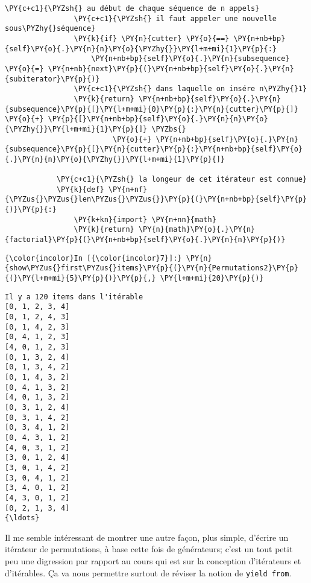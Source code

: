 \begin{Verbatim}[commandchars=\\\{\}]
                \PY{c+c1}{\PYZsh{} au début de chaque séquence de n appels}
                \PY{c+c1}{\PYZsh{} il faut appeler une nouvelle sous\PYZhy{}séquence}
                \PY{k}{if} \PY{n}{cutter} \PY{o}{==} \PY{n+nb+bp}{self}\PY{o}{.}\PY{n}{n}\PY{o}{\PYZhy{}}\PY{l+m+mi}{1}\PY{p}{:}
                    \PY{n+nb+bp}{self}\PY{o}{.}\PY{n}{subsequence} \PY{o}{=} \PY{n+nb}{next}\PY{p}{(}\PY{n+nb+bp}{self}\PY{o}{.}\PY{n}{subiterator}\PY{p}{)}
                \PY{c+c1}{\PYZsh{} dans laquelle on insére n\PYZhy{}1}
                \PY{k}{return} \PY{n+nb+bp}{self}\PY{o}{.}\PY{n}{subsequence}\PY{p}{[}\PY{l+m+mi}{0}\PY{p}{:}\PY{n}{cutter}\PY{p}{]} \PY{o}{+} \PY{p}{[}\PY{n+nb+bp}{self}\PY{o}{.}\PY{n}{n}\PY{o}{\PYZhy{}}\PY{l+m+mi}{1}\PY{p}{]} \PYZbs{}
                         \PY{o}{+} \PY{n+nb+bp}{self}\PY{o}{.}\PY{n}{subsequence}\PY{p}{[}\PY{n}{cutter}\PY{p}{:}\PY{n+nb+bp}{self}\PY{o}{.}\PY{n}{n}\PY{o}{\PYZhy{}}\PY{l+m+mi}{1}\PY{p}{]}
        
            \PY{c+c1}{\PYZsh{} la longeur de cet itérateur est connue}
            \PY{k}{def} \PY{n+nf}{\PYZus{}\PYZus{}len\PYZus{}\PYZus{}}\PY{p}{(}\PY{n+nb+bp}{self}\PY{p}{)}\PY{p}{:}
                \PY{k+kn}{import} \PY{n+nn}{math}
                \PY{k}{return} \PY{n}{math}\PY{o}{.}\PY{n}{factorial}\PY{p}{(}\PY{n+nb+bp}{self}\PY{o}{.}\PY{n}{n}\PY{p}{)}
\end{Verbatim}


    \begin{Verbatim}[commandchars=\\\{\}]
{\color{incolor}In [{\color{incolor}7}]:} \PY{n}{show\PYZus{}first\PYZus{}items}\PY{p}{(}\PY{n}{Permutations2}\PY{p}{(}\PY{l+m+mi}{5}\PY{p}{)}\PY{p}{,} \PY{l+m+mi}{20}\PY{p}{)}
\end{Verbatim}


    \begin{Verbatim}[commandchars=\\\{\}]
Il y a 120 items dans l'itérable
[0, 1, 2, 3, 4]
[0, 1, 2, 4, 3]
[0, 1, 4, 2, 3]
[0, 4, 1, 2, 3]
[4, 0, 1, 2, 3]
[0, 1, 3, 2, 4]
[0, 1, 3, 4, 2]
[0, 1, 4, 3, 2]
[0, 4, 1, 3, 2]
[4, 0, 1, 3, 2]
[0, 3, 1, 2, 4]
[0, 3, 1, 4, 2]
[0, 3, 4, 1, 2]
[0, 4, 3, 1, 2]
[4, 0, 3, 1, 2]
[3, 0, 1, 2, 4]
[3, 0, 1, 4, 2]
[3, 0, 4, 1, 2]
[3, 4, 0, 1, 2]
[4, 3, 0, 1, 2]
[0, 2, 1, 3, 4]
{\ldots}

    \end{Verbatim}


    Il me semble intéressant de montrer une autre façon, plus simple,
d'écrire un itérateur de permutations, à base cette fois de générateurs;
c'est un tout petit peu une digression par rapport au cours qui est sur
la conception d'itérateurs et d'itérables. Ça va nous permettre surtout
de réviser la notion de \texttt{yield\ from}.

